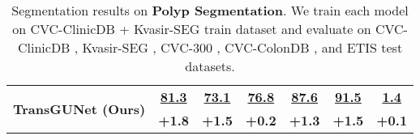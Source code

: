 \begin{table}[h]
\begin{tabular}{c|cccccc}
     \hline
     \multicolumn{1}{c|}{\multirow{2}{*}{\textbf{TransGUNet \tiny{(Ours)}}}}     & \textbf{\underline{81.3}} & \textbf{\underline{73.1}} & \textbf{\underline{76.8}} & \textbf{\underline{87.6}} & \textbf{\underline{91.5}} & \textbf{\underline{1.4}} \\ \cline{2-7}
     & \textbf{+1.8} & \textbf{+1.5} & \textbf{+0.2} & \textbf{+1.3} & \textbf{+1.5} & \textbf{+0.1} \\
     \hline
    \end{tabular}
    \caption{Segmentation results on \textbf{Polyp Segmentation}. We train each model on CVC-ClinicDB \cite{bernal2015wm} + Kvasir-SEG \cite{jha2020kvasir} train dataset and evaluate on CVC-ClinicDB \cite{bernal2015wm}, Kvasir-SEG \cite{jha2020kvasir}, CVC-300 \cite{vazquez2017benchmark}, CVC-ColonDB \cite{tajbakhsh2015automated}, and ETIS \cite{silva2014toward} test datasets.}
    \label{tab:comparison_sota_colonoscopy_other_metrics}
\end{table}

